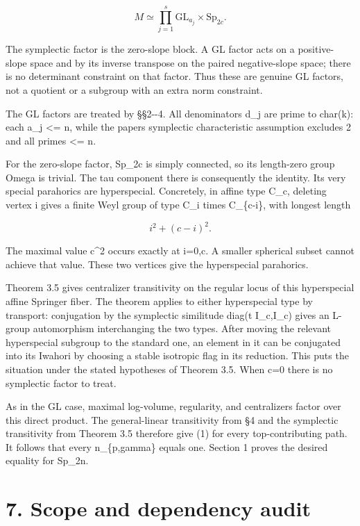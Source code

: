 \documentclass[11pt,a4paper]{article}
\begin{document}
\[
 M\simeq\prod_{j=1}^s\mathrm{GL}_{a_j}\times\mathrm{Sp}_{2c}.
\]

The symplectic factor is the zero-slope block. A GL factor acts on a
positive-slope space and by its inverse transpose on the paired
negative-slope space; there is no determinant constraint on that factor.
Thus these are genuine GL factors, not a quotient or a subgroup with an
extra norm constraint.

The GL factors are treated by §§2-\/-4. All denominators d\_j are prime
to char(k): each a\_j \textless= n, while the paper\textquotesingle s
symplectic characteristic assumption excludes 2 and all primes
\textless= n.

For the zero-slope factor, Sp\_2c is simply connected, so its
length-zero group Omega is trivial. The tau component there is
consequently the identity. Its very special parahorics are hyperspecial.
Concretely, in affine type C\_c, deleting vertex i gives a finite Weyl
group of type C\_i times C\_\{c-i\}, with longest length

\[
 i^2+(c-i)^2.
\]

The maximal value c\^{}2 occurs exactly at i=0,c. A smaller spherical
subset cannot achieve that value. These two vertices give the
hyperspecial parahorics.

Theorem 3.5 gives centralizer transitivity on the regular locus of this
hyperspecial affine Springer fiber. The theorem applies to either
hyperspecial type by transport: conjugation by the symplectic similitude
diag(t I\_c,I\_c) gives an L-group automorphism interchanging the two
types. After moving the relevant hyperspecial subgroup to the standard
one, an element in it can be conjugated into its Iwahori by choosing a
stable isotropic flag in its reduction. This puts the situation under
the stated hypotheses of Theorem 3.5. When c=0 there is no symplectic
factor to treat.

As in the GL case, maximal log-volume, regularity, and centralizers
factor over this direct product. The general-linear transitivity from §4
and the symplectic transitivity from Theorem 3.5 therefore give (1) for
every top-contributing path. It follows that every n\_\{p,gamma\} equals
one. Section 1 proves the desired equality for Sp\_2n.

\section{7. Scope and dependency
audit}\label{scope-and-dependency-audit}
\end{document}
